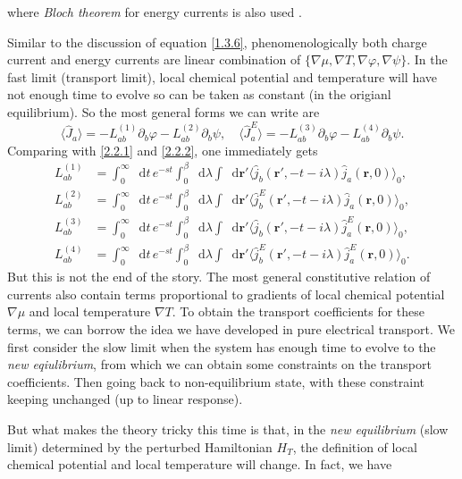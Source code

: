 \documentclass[10pt,nofootinbib,letterpaper]{revtex4}
\newcommand*\dd{\mathop{}\!\mathrm{d}}
\begin{document}
		where \emph{Bloch theorem} for energy currents is also used \cite{kapustin2019absence}.\par
		Similar to the discussion of equation \eqref{1.3.6}, phenomenologically both charge current and energy currents are linear combination of $\{\nabla\mu,\nabla T,\nabla\varphi,\nabla\psi\}$. In the fast limit (transport limit), local chemical potential and temperature will have not enough time to evolve so can be taken as constant (in the origianl equilibrium). So the most general forms we can write are
		\begin{equation}\label{2.2.3}
			\langle\hat J_a\rangle=-L_{ab}^{(1)}\partial_b\varphi-L^{(2)}_{ab}\partial_b\psi,\quad\langle\hat J_a^E\rangle=-L^{(3)}_{ab}\partial_b\varphi-L^{(4)}_{ab}\partial_b\psi.
		\end{equation}
		Comparing with \eqref{2.2.1} and \eqref{2.2.2}, one immediately gets
		\begin{align*}
			L_{ab}^{(1)}&=\int_0^\infty\dd t\,e^{-st}\int_0^\beta\dd\lambda\int\dd\bm{r'}\langle\hat j_b(\bm{r'},-t-i\lambda)\hat j_a(\bm{r},0)\rangle_0,\\
			L_{ab}^{(2)}&=\int_0^\infty\dd t\,e^{-st}\int_0^\beta\dd\lambda\int\dd\bm{r'}\langle\hat j_b^E(\bm{r'},-t-i\lambda)\hat j_a(\bm{r},0)\rangle_0,\\
			L_{ab}^{(3)}&=\int_0^\infty\dd t\,e^{-st}\int_0^\beta\dd\lambda\int\dd\bm{r'}\langle\hat j_b(\bm{r'},-t-i\lambda)\hat j_a^E(\bm{r},0)\rangle_0,\\
			L_{ab}^{(4)}&=\int_0^\infty\dd t\,e^{-st}\int_0^\beta\dd\lambda\int\dd\bm{r'}\langle\hat j_b^E(\bm{r'},-t-i\lambda)\hat j_a^E(\bm{r},0)\rangle_0.
		\end{align*}
		\indent But this is not the end of the story. The most general constitutive relation of currents also contain terms proportional to gradients of local chemical potential $\nabla\mu$ and local temperature $\nabla T$. To obtain the transport coefficients for these terms, we can borrow the idea we have developed in pure electrical transport. {\color{red}We first consider the slow limit when the system has enough time to evolve to the \emph{new eqiulibrium}, from which we can obtain some constraints on the transport coefficients. Then going back to non-equilibrium state, with these constraint keeping unchanged (up to linear response)}.\par
		But what makes the theory tricky this time is that, in the \emph{new equilibrium} (slow limit) determined by the perturbed Hamiltonian $H_T$, the definition of local chemical potential and local temperature will change. In fact, we have
\end{document}
